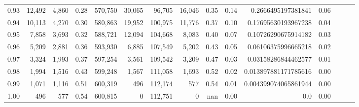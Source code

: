 \begin{tabular}{rrrrrrrrrrrrrrr}
0.93 &  12,492 &  4,860 &  0.28 &  570,750 &   30,065 &   96,705 &   16,046 &  0.35 &  0.14 &    0.2666495197381841 &      0.06 \\
0.94 &  10,113 &  4,270 &  0.30 &  580,863 &   19,952 &  100,975 &   11,776 &  0.37 &  0.10 &   0.17695630193967238 &      0.04 \\
0.95 &   7,858 &  3,693 &  0.32 &  588,721 &   12,094 &  104,668 &    8,083 &  0.40 &  0.07 &   0.10726290675914182 &      0.03 \\
0.96 &   5,209 &  2,881 &  0.36 &  593,930 &    6,885 &  107,549 &    5,202 &  0.43 &  0.05 &   0.06106375996665218 &      0.02 \\
0.97 &   3,324 &  1,993 &  0.37 &  597,254 &    3,561 &  109,542 &    3,209 &  0.47 &  0.03 &   0.03158286844462577 &      0.01 \\
0.98 &   1,994 &  1,516 &  0.43 &  599,248 &    1,567 &  111,058 &    1,693 &  0.52 &  0.02 &  0.013897881171785616 &      0.00 \\
0.99 &   1,071 &  1,116 &  0.51 &  600,319 &      496 &  112,174 &      577 &  0.54 &  0.01 &  0.004399074065861944 &      0.00 \\
1.00 &     496 &    577 &  0.54 &  600,815 &        0 &  112,751 &        0 &   nan &  0.00 &                   0.0 &      0.00 \\
\bottomrule
\end{tabular}
